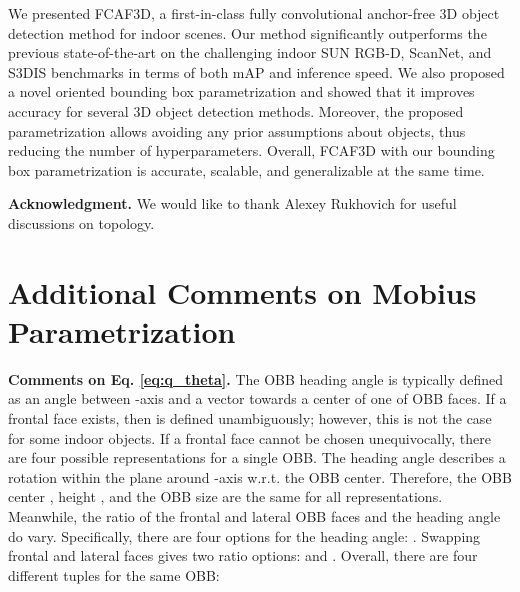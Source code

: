 \documentclass[runningheads]{llncs}
\begin{document}
We presented FCAF3D, a first-in-class fully convolutional anchor-free 3D object detection method for indoor scenes. Our method significantly outperforms the previous state-of-the-art on the challenging indoor SUN RGB-D, ScanNet, and S3DIS benchmarks in terms of both mAP and inference speed. We also proposed a novel oriented bounding box parametrization and showed that it improves accuracy for several 3D object detection methods. Moreover, the proposed parametrization allows avoiding any prior assumptions about objects, thus reducing the number of hyperparameters. Overall, FCAF3D with our bounding box parametrization is accurate, scalable, and generalizable at the same time. 

\textbf{Acknowledgment.} We would like to thank Alexey Rukhovich for useful discussions on topology.





\appendix

\section{Additional Comments on Mobius Parametrization}

\textbf{Comments on Eq. \ref{eq:q_theta}.}
The OBB heading angle  is typically defined as an angle between -axis and a vector towards a center of one of OBB faces. If a frontal face exists, then  is defined unambiguously; however, this is not the case for some indoor objects. If a frontal face cannot be chosen unequivocally, there are four possible representations for a single OBB. The heading angle describes a rotation within the  plane around -axis w.r.t. the OBB center. Therefore, the OBB center , height , and the OBB size  are the same for all representations. Meanwhile, the ratio  of the frontal and lateral OBB faces and the heading angle  do vary. Specifically, there are four options for the heading angle: . Swapping frontal and lateral faces gives two ratio options:  and . Overall, there are four different tuples  for the same OBB:
\end{document}
